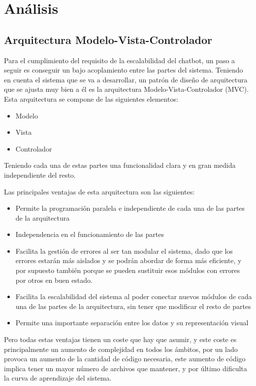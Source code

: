 \chapter{Análisis}


\section{Arquitectura Modelo-Vista-Controlador}

Para el cumplimiento del requisito de la escalabilidad del chatbot, un paso a seguir es conseguir un bajo acoplamiento entre las partes del sistema. Teniendo en cuenta el sistema que se va a desarrollar, un patrón de diseño de arquitectura que se ajusta muy bien a él es la arquitectura Modelo-Vista-Controlador (MVC). Esta arquitectura se compone de las siguientes elementos:

\begin{itemize}
    \item Modelo
    \item Vista
    \item Controlador
\end{itemize}

Teniendo cada una de estas partes una funcionalidad clara y en gran medida independiente del resto. 

Las principales ventajas de esta arquitectura son las siguientes:

\begin{itemize}
    \item Permite la programación paralela e independiente de cada una de las partes de la arquitectura
    \item Independencia en el funcionamiento de las partes
    \item Facilita la gestión de errores al ser tan modular el sistema, dado que los errores estarán más aislados y se podrán abordar de forma más eficiente, y por supuesto también porque se pueden sustituir esos módulos con errores por otros en buen estado.
    \item Facilita la escalabilidad del sistema al poder conectar nuevos módulos de cada una de las partes de la arquitectura, sin tener que modificar el resto de partes
    \item Permite una importante separación entre los datos y su representación visual
\end{itemize}

Pero todas estas ventajas tienen un coste que hay que asumir, y este coste es principalmente un aumento de complejidad en todos los ámbitos, por un lado provoca un aumento de la cantidad de código necesaria, este aumento de código implica tener un mayor número de archivos que mantener, y por último dificulta la curva de aprendizaje del sistema.

